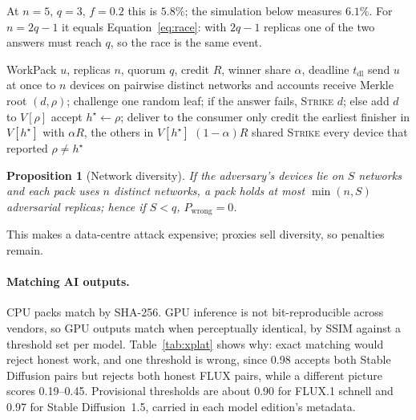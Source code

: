 \documentclass[11pt,a4paper]{article}
\theoremstyle{definition}
\theoremstyle{plain}
\newtheorem{proposition}{Proposition}[section]
\begin{document}
\noindent At $n=5$, $q=3$, $f=0.2$ this is $5.8\%$; the simulation below measures $6.1\%$. For $n=2q-1$ it equals
Equation~\eqref{eq:race}: with $2q-1$ replicas one of the two answers must reach $q$, so the race is the same event.

\begin{algorithm}[ht]
\caption{Competitive WorkPack dispatch with hybrid acceptance (abbreviated)}\label{alg:race}
\begin{algorithmic}[1]
\Require WorkPack $u$, replicas $n$, quorum $q$, credit $R$, winner share $\alpha$, deadline $t_{\mathrm{dl}}$
\State send $u$ at once to $n$ devices on pairwise distinct networks and accounts
  \State receive Merkle root $(d,\rho)$; challenge one random leaf; if the answer fails, \textsc{Strike} $d$; else add $d$ to $V[\rho]$ 
   accept $h^\star\gets \rho$; deliver to the consumer only \EndIf
\EndWhile
\State credit the earliest finisher in $V[h^\star]$ with $\alpha R$, the others in $V[h^\star]$ $(1-\alpha)R$ shared
\State \textsc{Strike} every device that reported $\rho\ne h^\star$ 
\end{algorithmic}
\end{algorithm}

\begin{proposition}[Network diversity]\label{prop:net}
If the adversary's devices lie on $S$ networks and each pack uses $n$ distinct networks, a pack holds at most
$\min(n,S)$ adversarial replicas; hence if $S<q$, $P_{\text{wrong}}=0$.
\end{proposition}

\noindent This makes a data-centre attack expensive; proxies sell diversity, so penalties remain.

\paragraph{Matching AI outputs.} CPU packs match by SHA-256. GPU inference is not bit-reproducible across
vendors, so GPU outputs match when perceptually identical, by SSIM \citep{wang2004ssim} against a threshold set
per model. Table~\ref{tab:xplat} shows why: exact matching would reject honest work, and one threshold is wrong, since
0.98 accepts both Stable Diffusion pairs but rejects both honest FLUX pairs, while a different picture scores 0.19--0.45. Provisional thresholds are about 0.90 for FLUX.1 schnell and 0.97 for Stable
Diffusion~1.5, carried in each model edition's metadata.
\end{document}
